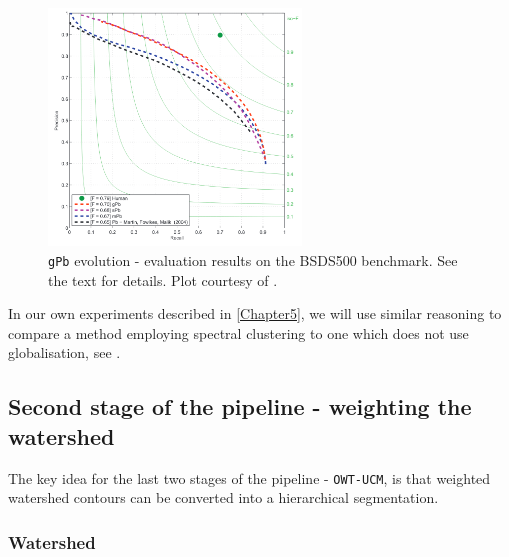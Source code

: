 \begin{figure}[ht!]
 \centering
 \includegraphics[width=0.6\textwidth]{images/gPb-OWT-UCM/Pb_mPb_sPb_gPb.png}
 \caption[{\tt gPb} evolution - plot results on the BSDS500 benchmark.]{{\tt gPb} evolution - evaluation results on the BSDS500 benchmark. See the text for details. Plot courtesy of \cite{Arbelaez11}.}
 \label{fig:Pb_mPb_sPb_gPb}
\end{figure}

In our own experiments described in \cref{Chapter5}, we will use similar reasoning to compare a method employing spectral clustering to one which does not use globalisation, see .

\subsection{Second stage of the pipeline - weighting the watershed} %
The key idea for the last two stages %
of the pipeline - {\tt OWT-UCM}, is that weighted watershed contours can be converted into a hierarchical segmentation.

\subsubsection{Watershed}
\label{sec:ch3-watershed}

